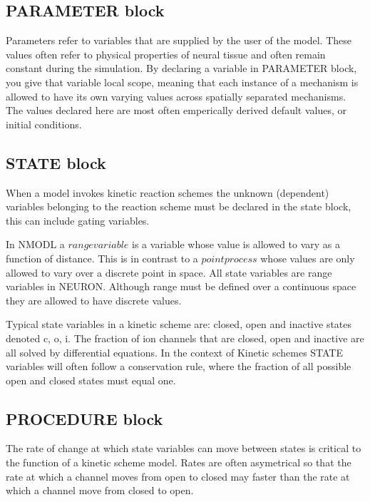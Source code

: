 \documentclass[draftspec]{ninemlspec}
\begin{document}
\subsection{PARAMETER block}

Parameters refer to variables that are supplied by the user of the model. These values often refer to physical properties of neural tissue and often remain constant during the simulation.  By declaring a variable in PARAMETER block, you give that variable local scope, meaning that each instance of a mechanism is allowed to have its own varying values across spatially separated mechanisms. The values declared here are most often emperically derived default values, or initial conditions.




\subsection{STATE block}

When a model invokes kinetic reaction schemes the unknown (dependent) variables belonging to the reaction scheme must be declared in the state block, this can include gating variables.

In NMODL a $range variable$ is a variable whose value is allowed to vary as a function of distance. This is in contrast to a $point process$ whose values are only allowed to vary over a discrete point in space. All state variables are range variables in NEURON. Although range must be defined over a continuous space they are allowed to have discrete values. 

Typical state variables in a kinetic scheme are: closed, open and inactive states denoted c, o, i. The fraction of ion channels that are closed, open and inactive are all solved by differential equations. In the context of Kinetic schemes STATE variables will often follow a conservation rule, where the fraction of all possible open and closed states must equal one.


\subsection{PROCEDURE block}
The rate of change at which state variables can move between states is critical to the function of a kinetic scheme model. Rates are often asymetrical so that the rate at which a channel moves from open to closed may faster than the rate at which a channel move from closed to open. 
\end{document}
